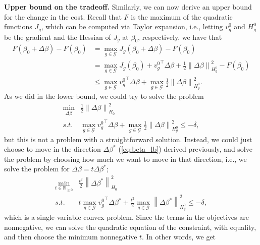 \documentclass[11pt]{article}
\theoremstyle{plain}
\theoremstyle{definition}
\newcommand{\R}{\mathbb{R}}
\newcommand{\norm}[1]{\left\lVert #1 \right\rVert}
\newcommand{\1}{\mathbf{1}}
\newcommand{\G}{\mathcal{G}}
\renewcommand{\t}{^{\top}}
\renewcommand{\R}{\mathbb{R}}
\begin{document}
\noindent \textbf{Upper bound on the tradeoff.} Similarly, we can now derive an upper bound for the change in the cost. Recall that $F$ is the maximum of the quadratic functions $J_g$, which can be computed via Taylor expansion, i.e., letting $v_g^0$ and $H_g^0$ be the gradient and the Hessian of $J_g$ at $\beta_0$, respectively, we have that
\begin{align*}
    F(\beta_0 + \Delta \beta) - F(\beta_0)&= \max_{g\in \G} J_g(\beta_0 + \Delta \beta) - F(\beta_0) \\
    &= \max_{g\in \G} J_g(\beta_0 ) +{v_g^0}\t \Delta \beta + \frac{1}{2}\norm{\Delta \beta}_{H_g^0}^2 - F(\beta_0)\\
    &\leq  \max_{g\in \G} {v_g^0}\t \Delta \beta + \max_{g\in \G} \frac{1}{2}\norm{\Delta \beta}_{H_g^0}^2.
\end{align*}
As we did in the lower bound, we could try to solve the problem 
\begin{equation*}
\label{opt:upper_bound_1}
    \begin{array}{cc}
      \displaystyle  \min_{\Delta \beta} & \frac{1}{2}\norm{\Delta \beta}^2_{H_0} \\
        s.t. &  \max_{g\in \G} {v_g^0}\t \Delta \beta + \max_{g\in \G} \frac{1}{2}\norm{\Delta \beta}_{H_g^0}^2 \leq -\delta, %
    \end{array}
\end{equation*}
but this is not a problem with a straightforward solution. Instead, we could just choose to move in the direction $\Delta \beta^*$ (\ref{eq:beta_lb}) derived previously, and solve the problem by choosing how much we want to move in that direction, i.e., we solve the problem for $\Delta \beta = t \Delta\beta^*$;
\begin{equation*}
\label{opt:upper_bound_1}
    \begin{array}{cc}
      \displaystyle  \min_{t\in \R_{\geq 0}} & \frac{t^2}{2}\norm{ \Delta \beta^*}^2_{H_0} \\
        s.t. &  t \max_{g\in \G} {v_g^0}\t \Delta \beta^* + \frac{t^2}{2}\max_{g\in \G} \norm{\Delta \beta^*}_{H_g^0}^2 \leq -\delta, %
    \end{array}
\end{equation*}
which is a single-variable convex problem. Since the terms in the objectives are nonnegative, we can solve the quadratic equation of the constraint, with equality, and then choose the minimum nonnegative $t$. In other words, we get 
\end{document}
